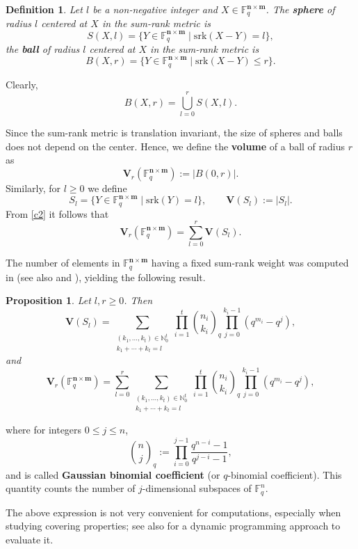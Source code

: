\documentclass[a4paper]{article}
\newtheorem{definition}[formula]{Definition}
\newtheorem{proposition}[formula]{Proposition}
\newcommand{\F}{\mathbb{F}}
\newcommand{\bfn}{\mathbf {n}}
\newcommand{\bfm}{\mathbf {m}}
\newcommand{\spac}{\F^{\bfn\times\bfm}_q}
\newcommand{\srk}{\mathrm{srk}}
\begin{document}
\begin{definition}
Let $l$ be a non-negative integer and $X\in\spac$. The \textbf{sphere} of radius $l$ centered at $X$ in the sum-rank metric is
\[
S(X,l)=\{Y\in\spac \mid \srk(X-Y)=l\},
\]
the \textbf{ball} of radius $l$ centered at $X$ in the sum-rank metric is
\[
B(X,r)=\{Y\in\spac \mid \srk(X-Y)\le r\}.
\]
\end{definition}

Clearly,
\begin{equation}\label{c2}
B(X,r)=\bigcup_{l=0}^r S(X,l).
\end{equation}

Since the sum-rank metric is translation invariant, the size of spheres and balls does not depend on the center. Hence, we define the \textbf{volume} of a ball of radius $r$ as
\[
\mathbf{V}_r(\spac):=|B(0,r)|.
\]
Similarly, for $l\ge0$ we define
\[
S_l=\{Y\in\spac \mid \srk(Y)=l\}, \qquad 
\mathbf{V}(S_l):=|S_l|.
\]
From \eqref{c2} it follows that
\begin{equation}\label{c3}
\mathbf{V}_r(\spac)=\sum_{l=0}^{r}\mathbf{V}(S_l).
\end{equation}

The number of elements in $\spac$ having a fixed sum-rank weight was computed in \cite[Section III]{byrne2021fundamental} (see also \cite[Section 4]{sauerbier2025bounds} and \cite{PRZ2025}), yielding the following result.

\begin{proposition}\label{c6}
Let $l,r\ge0$. Then
\[
\mathbf{V}(S_l)=
\sum_{\substack{(k_1,\ldots,k_t)\in\mathbb{N}_0^t \\ k_1+\cdots+k_t=l}}
\prod_{i=1}^{t}
{n_i \choose k_i}_q
\prod_{j=0}^{k_i-1}(q^{m_i}-q^j),
\]
and
\[
\mathbf{V}_r(\spac)=
\sum_{l=0}^{r}
\sum_{\substack{(k_1,\ldots,k_t)\in\mathbb{N}_0^t \\ k_1+\cdots+k_t=l}}
\prod_{i=1}^{t}
{n_i \choose k_i}_q
\prod_{j=0}^{k_i-1}(q^{m_i}-q^j),
\]
\end{proposition}

where for integers $0 \leq j \leq n$,
\[
{n \choose j}_q := \prod_{i=0}^{j-1} \frac{q^{n-i} - 1}{q^{j-i} - 1},
\]
and is called \textbf{Gaussian binomial coefficient} (or $q$-binomial coefficient).
This quantity counts the number of $j$-dimensional subspaces of $\mathbb{F}_q^n$.

The above expression is not very convenient for computations, especially when studying covering properties; see also \cite{puchinger2022generic} for a dynamic programming approach to evaluate it.
\end{document}
